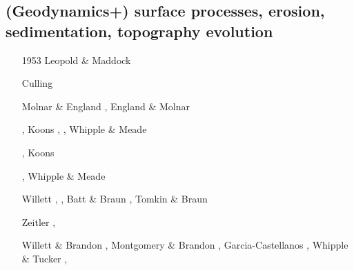 \subsection{(Geodynamics+) surface processes, erosion, sedimentation, topography evolution}

\begin{scriptsize}
\begin{itemize}
\item [1953] Leopold \& Maddock \cite{lema53}
\item [\nineteensixty] Culling \cite{cull60}
\item [\nineteenninety] Molnar \& England \cite{moen90}, England \& Molnar \cite{enmo90}
\item [\nineteenninetytwo] \cite{befh92}\cite{chas92}
\item [\nineteenninetythree] \cite{povp93}\cite{wibf93}
\item [\nineteenninetyfour] \cite{howa94}, Koons \cite{koon94}, \cite{kobe94}\cite{gikb94}, 
                             Whipple \& Meade \cite{whme04}
\item [\nineteenninetyfive] \cite{chmm95}, Koons \cite{koon95}
\item [\nineteenninetysix] \cite{avbu96}\cite{bekh96}\cite{kobe96},
                     Whipple \& Meade \cite{whme06}
\item [\nineteenninetyseven] \cite{brsa97}\cite{gaft97}\cite{babr97}
\item [\nineteenninetyeight] \cite{deea98}\cite{vabr98}
\item [\nineteenninetynine] Willett \cite{will99a}, \cite{bupi99}, 
                            Batt \& Braun \cite{babr99}, Tomkin \& Braun \cite{tobr99}
\item [\twothousandone] Zeitler \etal \cite{zemk01}, \cite{tulg01}
                 \cite{brsh01}\cite{bupo01}\cite{coul01}\cite{crda01}\cite{moln01}
\item [\twothousandtwo] Willett \& Brandon \cite{wibr02}, Montgomery \& Brandon \cite{mobr02},
                        Garcia-Castellanos \cite{garc02}, Whipple \& Tucker \cite{whtu02}, 

\end{itemize}
\end{scriptsize}
